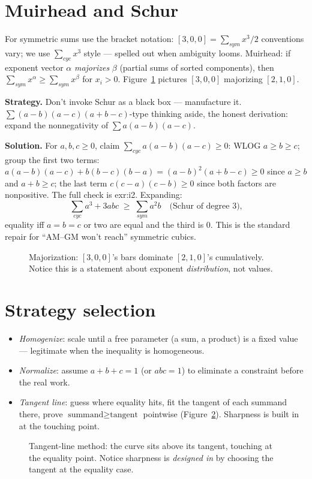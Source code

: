 \section{Muirhead and Schur}

For symmetric sums use the bracket notation:
$[3,0,0] = \sum_{sym} x^3/2$ conventions vary; we use
$\sum_{cyc} x^3$ style --- spelled out when ambiguity looms. Muirhead:
if exponent vector $\alpha$ \emph{majorizes} $\beta$
(partial sums of sorted components), then
$\sum_{sym}x^{\alpha} \ge \sum_{sym}x^{\beta}$ for $x_i>0$.
Figure~\ref{fig:major} pictures $[3,0,0]$ majorizing $[2,1,0]$.

\begin{example}
\textbf{Strategy.} Don't invoke Schur as a black box --- manufacture it.
$\sum (a-b)(a-c)(a+b-c)$-type thinking aside, the honest derivation:
expand the nonnegativity of $\sum a(a-b)(a-c)$.

\textbf{Solution.} For $a,b,c\ge0$, claim
$\sum_{cyc} a(a-b)(a-c) \ge 0$: WLOG $a\ge b\ge c$; group the first two
terms: $a(a-b)(a-c)+b(b-c)(b-a) = (a-b)^2(a+b-c) \ge 0$ since $a\ge b$
and $a+b\ge c$; the last term $c(c-a)(c-b) \ge 0$ since both factors are
nonpositive. The full check is exr:i2. Expanding:
\[
\sum_{cyc} a^3 + 3abc \;\ge\; \sum_{sym} a^2 b
\quad\text{(Schur of degree 3),}
\]
equality iff $a=b=c$ or two are equal and the third is $0$. This is the
standard repair for ``AM--GM won't reach'' symmetric cubics.
\end{example}

\begin{figure}[ht]\centering

\caption{Majorization: $[3,0,0]$'s bars dominate $[2,1,0]$'s cumulatively.
Notice this is a statement about exponent \emph{distribution}, not values.}
\label{fig:major}
\end{figure}

\section{Strategy selection}

\begin{itemize}
\item \emph{Homogenize}: scale until a free parameter (a sum, a product)
is a fixed value --- legitimate when the inequality is homogeneous.
\item \emph{Normalize}: assume $a+b+c=1$ (or $abc=1$) to eliminate a
constraint before the real work.
\item \emph{Tangent line}: guess where equality hits, fit the tangent of
each summand there, prove $\text{summand} \ge \text{tangent}$ pointwise
(Figure~\ref{fig:tangent}). Sharpness is built in at the touching point.
\end{itemize}
\begin{figure}[ht]\centering

\caption{Tangent-line method: the curve sits above its tangent, touching
at the equality point. Notice sharpness is \emph{designed in} by choosing
the tangent at the equality case.}
\label{fig:tangent}
\end{figure}

